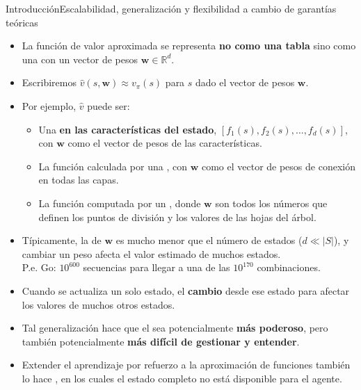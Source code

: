 \documentclass[10pt, envcountsect, handout, aspectratio=1610, hyperref={hypertexnames=true}]{beamer}
\begin{document}
\begin{frame}{Introducción}{Escalabilidad, generalización y flexibilidad a cambio de garantías teóricas}
\begin{itemize}
    \item La función de valor aproximada se representa \textbf{no como una tabla} sino como una  con un vector de pesos $\mathbf{w} \in \mathbb{R}^d$.
    
    \item Escribiremos $\hat{v}(s, \mathbf{w}) \approx v_\pi(s)$ para  $s$ dado el vector de pesos $\mathbf{w}$.
    
    \item Por ejemplo, $\hat{v}$ puede ser:
    \begin{itemize}
        \item Una  \textbf{en las características del estado}, $[f_1(s), f_2(s), \ldots, f_d(s)]$, con $\mathbf{w}$ como el vector de pesos de las características.
        
        \item La función calculada por una , con $\mathbf{w}$ como el vector de pesos de conexión en todas las capas.
        
        \item La función computada por un , donde $\mathbf{w}$ son todos los números que definen los puntos de división y los valores de las hojas del árbol.
    \end{itemize}
    
    \item Típicamente, la  de $\mathbf{w}$ es mucho menor que el número de estados ($d \ll |S|$), y cambiar un peso afecta el valor estimado de muchos estados. \\ \hfil P.e. Go: $10^{600}$ secuencias para llegar a una de las $10^{170}$ combinaciones.
    
    \item Cuando se actualiza un solo estado, el \textbf{cambio}  desde ese estado para afectar los valores de muchos otros estados.
    
    \item Tal generalización hace que el  sea potencialmente \textbf{más poderoso}, pero también potencialmente \textbf{más difícil de gestionar y entender}.
    
    \item Extender el aprendizaje por refuerzo a la aproximación de funciones también lo hace , en los cuales el estado completo no está disponible para el agente.
    
\end{itemize}

\end{frame}
\end{document}
